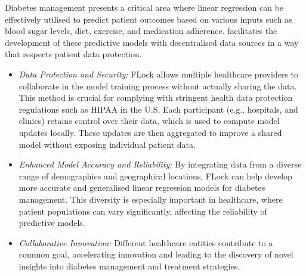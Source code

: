 \documentclass[conference]{IEEEtran}
\begin{document}
Diabetes management presents a critical area where linear regression can be effectively utilised to predict patient outcomes based on various inputs such as blood sugar levels, diet, exercise, and medication adherence. \FL facilitates the development of these predictive models with decentralised data sources in a way that respects patient data protection.


\begin{itemize}
    \item \emph{Data Protection and Security:} FLock allows multiple healthcare providers to collaborate in the model training process without actually sharing the data. This method is crucial for complying with stringent health data protection regulations such as HIPAA in the U.S. Each participant (e.g., hospitals, and clinics) retains control over their data, which is used to compute model updates locally. These updates are then aggregated to improve a shared model without exposing individual patient data.

\item \emph{Enhanced Model Accuracy and Reliability:} By integrating data from a diverse range of demographics and geographical locations, FLock can help develop more accurate and generalised linear regression models for diabetes management. This diversity is especially important in healthcare, where patient populations can vary significantly, affecting the reliability of predictive models.

\item \emph{Collaborative Innovation:} Different healthcare entities contribute to a common goal, accelerating innovation and leading to the discovery of novel insights into diabetes management and treatment strategies.
\end{itemize}




\end{document}
